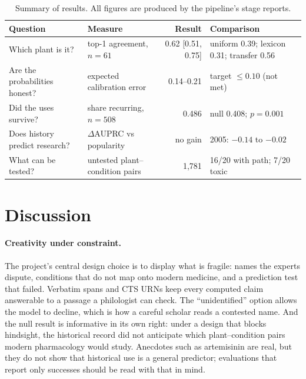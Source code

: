 \documentclass[11pt,a4paper]{article}
\begin{document}
\begin{table}[t]
\centering\small
\caption{Summary of results. All figures are produced by the pipeline’s stage reports.}
\label{tab:results}
\begin{tabularx}{\linewidth}{@{}X l r l@{}}
\toprule
Question & Measure & Result & Comparison \\
\midrule
Which plant is it? & top-1 agreement, $n = 61$ & 0.62 [0.51, 0.75] & uniform 0.39; lexicon 0.31; transfer 0.56 \\
Are the probabilities honest? & expected calibration error & 0.14–0.21 & target $\le 0.10$ (not met) \\
Did the uses survive? & share recurring, $n = 508$ & 0.486 & null 0.408; $p = 0.001$ \\
Does history predict research? & $\Delta$AUPRC vs popularity & no gain & 2005: $-0.14$ to $-0.02$ \\
What can be tested? & untested plant–condition pairs & 1,781 & 16/20 with path; 7/20 toxic \\
\bottomrule
\end{tabularx}
\end{table}

\section{Discussion}

\paragraph{Creativity under constraint.} The project’s central design choice is to display what is fragile: names the experts dispute, conditions that do not map onto modern medicine, and a prediction test that failed. Verbatim spans and CTS URNs keep every computed claim answerable to a passage a philologist can check. The “unidentified” option allows the model to decline, which is how a careful scholar reads a contested name. And the null result is informative in its own right: under a design that blocks hindsight, the historical record did not anticipate which plant–condition pairs modern pharmacology would study. Anecdotes such as artemisinin are real, but they do not show that historical use is a general predictor; evaluations that report only successes should be read with that in mind.
\end{document}
